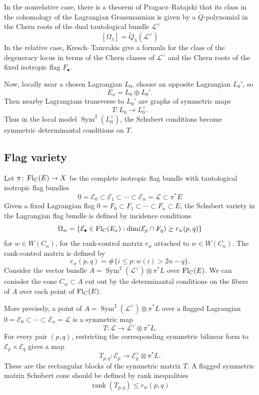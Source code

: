 \documentclass[12pt]{article}
\begin{document}
In the nonrelative case, there is a theorem of Pragacz--Ratajski that its class in the cohomology of the Lagrangian Grassmannian is given by a $\widetilde{Q}$-polynomial in the Chern roots of the dual tautological bundle $\mathcal{L}^\vee$
\[
    [\Omega_\lambda]
    =
    \widetilde{Q}_\lambda(\mathcal{L}^\vee)
\]
In the relative case, Kresch--Tamvakis give a formula for the class of the degeneracy locus in terms of the Chern classes of $\mathcal{L}^\vee$ and the Chern roots of the fixed isotropic flag $F_\bullet$.


Now, locally near a chosen Lagrangian $L_0$, choose an opposite Lagrangian $L_0'$, so
\[
    E_x=L_0\oplus L_0'.
\]
Then nearby Lagrangians transverse to $L_0'$ are graphs of symmetric maps
\[
    T\colon L_0\to L_0^\vee.
\]
Thus in the local model $\operatorname{Sym}^2(L_0^\vee)$, the Schubert conditions become symmetric determinantal conditions on $T$.

\subsection{Flag variety}
Let $\pi\colon \operatorname{Fl}_C(E)\to X$ be the complete isotropic flag bundle with tautological isotropic flag bundles
\[
    0=\mathcal E_0\subset \mathcal E_1\subset\cdots\subset \mathcal E_n=\mathcal L\subset \pi^*E
    \]
    Given a fixed Lagrangian flag $0=F_0\subset F_1\subset\cdots\subset F_n\subset E$, the Schubert variety in the Lagrangian flag bundle is defined by incidence conditions
\[
    \Omega_w =
    \left\{
    \mathcal E_\bullet\in \operatorname{Fl}_C(E_x) : \dim(\mathcal E_p\cap F_q)\ge r_w(p,q)
    \right\}
\]
for $w\in W(C_n)$, for the rank-control matrix \(r_w\) attached to $w\in W(C_n)$. The rank-control matrix is defined by
\[
    r_w(p,q)
    =
    \#\{i\le p : w(i)> 2n-q\}.
\]
Consider the vector bundle $A=\operatorname{Sym}^2(\mathcal{L}^\vee)\otimes \pi^*L$ over $\operatorname{Fl}_C(E)$. We can conisder the cone $C_w\subset A$ cut out by the determinantal conditions on the fibers of $A$ over each point of $\operatorname{Fl}_C(E)$.

More precisely, a point of $A=\operatorname{Sym}^2(\mathcal L^\vee)\otimes \pi^*L$
over a flagged Lagrangian \(0=\mathcal E_0\subset\cdots\subset
\mathcal E_n=\mathcal L\) is a symmetric map
\[
    T:\mathcal L\to \mathcal L^\vee\otimes \pi^*L.
\]
For every pair \((p,q)\), restricting the corresponding symmetric bilinear
form to \(\mathcal E_p\times \mathcal E_q\) gives a map
\[
    T_{p,q}:\mathcal E_p
    \longrightarrow
    \mathcal E_q^\vee\otimes \pi^*L.
\]
These are the rectangular blocks of the symmetric matrix \(T\). A flagged
symmetric matrix Schubert cone should be defined by rank inequalities
\[
    \operatorname{rank}(T_{p,q})\le r_w(p,q)
\]
\end{document}
